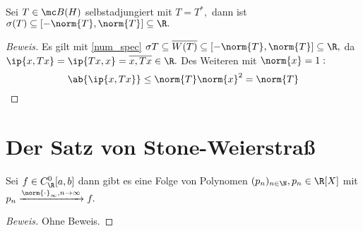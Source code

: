 \begin{theorem} Sei $T \in \mc B(H)$ selbstadjungiert mit $T = T^*,$ dann ist $\sigma(T) \subseteq [- \norm{T}, \norm{T}] \subseteq \R.$
	
	
	\begin{proof}[Beweis] Es gilt mit \ref{num_spec} $\sigma{T} \subseteq \overline{W(T)} \subseteq [-\norm{T}, \norm{T}] \subseteq \R,$ da $\ip{x, Tx} = \ip{Tx, x} = \overline{x, Tx} \in \R.$ Des Weiteren mit $\norm{x} = 1:$ \[\ab{\ip{x, Tx}} \leq \norm{T}\norm{x}^2 = \norm{T}\]
		
	\end{proof}
	
\end{theorem}


\section{Der Satz von Stone-Weierstraß}

\begin{theorem} Sei $f \in C^0_{\R}[a, b]$ dann gibt es eine Folge von Polynomen $(p_n)_{n \in \N}, p_n \in \R[X]$ mit $p_n \xrightarrow{\norm{\cdot}_{\infty}, n \to \infty}f.$
	
	\begin{proof}[Beweis] Ohne Beweis.
		
	\end{proof}
	
\end{theorem}


